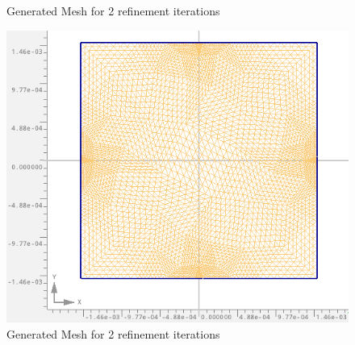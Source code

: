 \documentclass{article}
\begin{document}
\begin{figure}[htbp]
\begin{minipage}[b]{0.3\textwidth}
            \caption{Generated Mesh for 2 refinement iterations}
            \label{fig:FE_mesh_2}
        \end{minipage}
        \hfill
        \begin{minipage}[b]{0.3\textwidth}
            \includegraphics[width=\textwidth]{FE_mesh_3}
            \caption{Generated Mesh for 2 refinement iterations}
            \label{fig:FE_mesh_3}
        \end{minipage}
    \end{figure}
\end{document}
